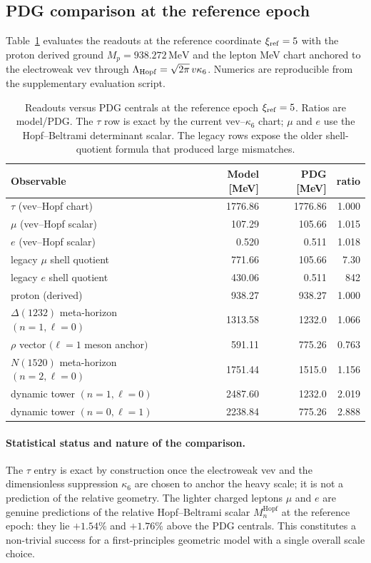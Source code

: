 \documentclass[11pt]{amsart}
\begin{document}
\subsection{PDG comparison at the reference epoch}

Table~\ref{tab:pdg-lockin} evaluates the readouts at the reference coordinate $\xi_{\rm ref}=5$ with the proton derived ground $M_p=938.272\,\mathrm{MeV}$ and the lepton MeV chart anchored to the electroweak vev through $\Lambda_{\rm Hopf}=\sqrt{2\pi}\,v\kappa_6$. Numerics are reproducible from the supplementary evaluation script.

\begin{table}[ht]
  \centering
  \caption{Readouts versus PDG centrals at the reference epoch $\xi_{\rm ref}=5$.
    Ratios are model/PDG. The $\tau$ row is exact by the current vev--$\kappa_6$ chart;
    $\mu$ and $e$ use the Hopf--Beltrami determinant scalar. The legacy rows expose the older
    shell-quotient formula that produced large mismatches.}
  \label{tab:pdg-lockin}
  \begin{tabular}{lrrr}
    \toprule
    Observable & Model [MeV] & PDG [MeV] & ratio \\
    \midrule
    $\tau$ (vev--Hopf chart) & 1776.86 & 1776.86 & 1.000 \\
    $\mu$ (vev--Hopf scalar) & 107.29 & 105.66 & 1.015 \\
    $e$ (vev--Hopf scalar) & 0.520 & 0.511 & 1.018 \\
    legacy $\mu$ shell quotient & 771.66 & 105.66 & 7.30 \\
    legacy $e$ shell quotient & 430.06 & 0.511 & 842 \\
    proton (derived) & 938.27 & 938.27 & 1.000 \\
    $\Delta(1232)$ meta-horizon $(n{=}1,\ell{=}0)$ & 1313.58 & 1232.0 & 1.066 \\
    $\rho$ vector $(\ell{=}1$ meson anchor$)$ & 591.11 & 775.26 & 0.763 \\
    $N(1520)$ meta-horizon $(n{=}2,\ell{=}0)$ & 1751.44 & 1515.0 & 1.156 \\
    dynamic tower $(n{=}1,\ell{=}0)$ & 2487.60 & 1232.0 & 2.019 \\
    dynamic tower $(n{=}0,\ell{=}1)$ & 2238.84 & 775.26 & 2.888 \\
    \bottomrule
  \end{tabular}
\end{table}

\paragraph{Statistical status and nature of the comparison.}
The \(\tau\) entry is exact by construction once the electroweak vev and the dimensionless suppression \(\kappa_6\) are chosen to anchor the heavy scale; it is not a prediction of the relative geometry. The lighter charged leptons \(\mu\) and \(e\) are genuine predictions of the relative Hopf--Beltrami scalar \(M_n^{\mathrm{Hopf}}\) at the reference epoch: they lie \(+1.54\%\) and \(+1.76\%\) above the PDG centrals. This constitutes a non-trivial success for a first-principles geometric model with a single overall scale choice.
\end{document}
